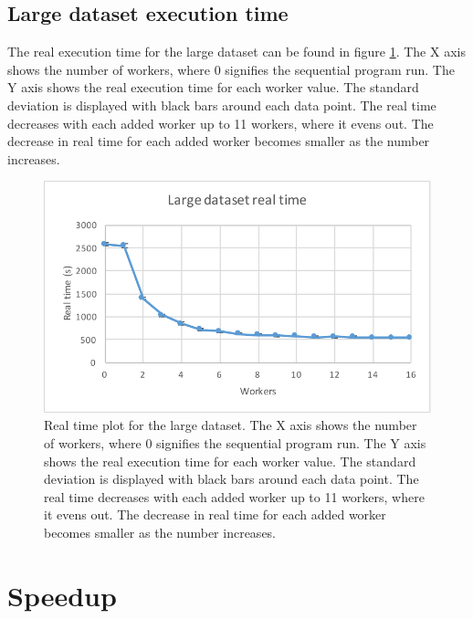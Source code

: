 \subsection{Large dataset execution time}
The real execution time for the large dataset can be found in figure \ref{fig:dataset_4_real_time}.
The X axis shows the number of workers, where 0 signifies the sequential program run.
The Y axis shows the real execution time for each worker value. The standard deviation is displayed with black bars around each data point. The real time
decreases with each added worker up to 11 workers, where it evens out. The decrease in real time for each added worker becomes smaller as the number increases.
\begin{figure}[ht]
  \centering
  \includegraphics[width=120mm]{figures/dataset_4/dataset_4_real_time.pdf}
  \caption[Real time plot for the large dataset.]{Real time plot for the large dataset. The X axis shows the number of workers, where 0 signifies the sequential program run.
  The Y axis shows the real execution time for each worker value. The standard deviation is displayed with black bars around each data point. The real time
  decreases with each added worker up to 11 workers, where it evens out. The decrease in real time for each added worker becomes smaller as the number increases.}
  \label{fig:dataset_4_real_time}
\end{figure}

\FloatBarrier

\section{Speedup}

